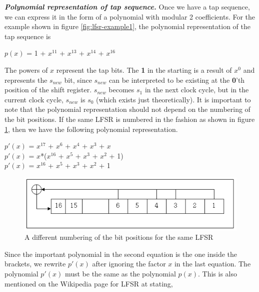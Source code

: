 \noindent \textit{\textbf{Polynomial representation of tap sequence.}} Once we have a tap sequence, we can express it in the form of a polynomial with modular 2 coefficients. For the example shown in figure \ref{fig:lfsr-example1}, the polynomial representation of the tap sequence is

\begin{center}
$p(x)$ =  1 + $x^{11}$ + $x^{13}$ + $x^{14}$ + $x^{16}$
\end{center}

The powers of $x$ represent the tap bits. The \textbf{1} in the starting is a result of $x^0$ and represents the $s_{new}$ bit, since $s_{new}$ can be interpreted to be existing at the \textbf{0}'th position of the shift register. $s_{new}$ becomes $s_1$ in the next clock cycle, but in the current clock cycle, $s_{new}$ is $s_0$ (which exists just theoretically). It is important to note that the polynomial representation should not depend on the numbering of the bit positions. If the same LFSR is numbered in the fashion as shown in figure \ref{fig:lfsr-example2}, then we have the following polynomial representation.

\begin{center}
$p'(x)$ = $x^{17}$ + $x^{6}$ + $x^{4}$ + $x^{3}$ + $x$\\

$p'(x)$ = $x$*($x^{16}$ + $x^{5}$ + $x^{3}$ + $x^{2}$ + 1)\\

$p'(x)$ = $x^{16}$ + $x^{5}$ + $x^{3}$ + $x^{2}$ + 1
\end{center}

\begin{figure}[ht!]
	\centering
		\includegraphics[width=5in]{./figures/lfsr-example-reverse.PNG}
	\caption{A different numbering of the bit positions for the same LFSR}	
	\label{fig:lfsr-example2}
\end{figure}

Since the important polynomial in the second equation is the one inside the brackets, we rewrite $p'(x)$ after ignoring the factor $x$ in the last equation. The polynomial $p'(x)$ must be the same as the polynomial $p(x)$. This is also mentioned on the Wikipedia page for LFSR at \cite{lfsr-wiki} stating,

